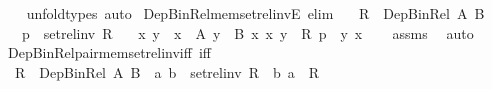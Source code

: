 \begin{isabellebody}
%
\isadelimproof
\ \ %
\endisadelimproof
%
\isatagproof
{}\isamarkupfalse%
\ unfold{\isacharunderscore}{\kern0pt}types\ auto%
\endisatagproof
{\isafoldproof}%
%
\isadelimproof
\isanewline
%
\endisadelimproof
\isanewline
{}\isamarkupfalse%
\ Dep{\isacharunderscore}{\kern0pt}Bin{\isacharunderscore}{\kern0pt}Rel{\isacharunderscore}{\kern0pt}mem{\isacharunderscore}{\kern0pt}set{\isacharunderscore}{\kern0pt}rel{\isacharunderscore}{\kern0pt}invE\ {\isacharbrackleft}{\kern0pt}elim{\isacharbrackright}{\kern0pt}{\isacharcolon}{\kern0pt}\isanewline
\ \ \ {\isachardoublequoteopen}R\ {\isacharcolon}{\kern0pt}\ Dep{\isacharunderscore}{\kern0pt}Bin{\isacharunderscore}{\kern0pt}Rel\ A\ B{\isachardoublequoteclose}\isanewline
\ \ \ {\isachardoublequoteopen}p\ {\isasymin}\ set{\isacharunderscore}{\kern0pt}rel{\isacharunderscore}{\kern0pt}inv\ R{\isachardoublequoteclose}\isanewline
\ \ \ x\ y\ \ {\isachardoublequoteopen}x\ {\isacharcolon}{\kern0pt}\ A{\isachardoublequoteclose}\ {\isachardoublequoteopen}y\ {\isacharcolon}{\kern0pt}\ B\ x{\isachardoublequoteclose}\ {\isachardoublequoteopen}{\isasymlangle}x{\isacharcomma}{\kern0pt}\ y{\isasymrangle}\ {\isasymin}\ R{\isachardoublequoteclose}\ {\isachardoublequoteopen}p\ {\isacharequal}{\kern0pt}\ {\isasymlangle}y{\isacharcomma}{\kern0pt}\ x{\isasymrangle}{\isachardoublequoteclose}\isanewline
%
\isadelimproof
\ \ %
\endisadelimproof
%
\isatagproof
{}\isamarkupfalse%
\ assms\ \isamarkupfalse%
\ auto%
\endisatagproof
{\isafoldproof}%
%
\isadelimproof
\isanewline
%
\endisadelimproof
\isanewline
{}\isamarkupfalse%
\ Dep{\isacharunderscore}{\kern0pt}Bin{\isacharunderscore}{\kern0pt}Rel{\isacharunderscore}{\kern0pt}pair{\isacharunderscore}{\kern0pt}mem{\isacharunderscore}{\kern0pt}set{\isacharunderscore}{\kern0pt}rel{\isacharunderscore}{\kern0pt}inv{\isacharunderscore}{\kern0pt}iff\ {\isacharbrackleft}{\kern0pt}iff{\isacharbrackright}{\kern0pt}{\isacharcolon}{\kern0pt}\isanewline
\ \ {\isachardoublequoteopen}R\ {\isacharcolon}{\kern0pt}\ Dep{\isacharunderscore}{\kern0pt}Bin{\isacharunderscore}{\kern0pt}Rel\ A\ B\ {\isasymLongrightarrow}\ {\isasymlangle}a{\isacharcomma}{\kern0pt}\ b{\isasymrangle}\ {\isasymin}\ set{\isacharunderscore}{\kern0pt}rel{\isacharunderscore}{\kern0pt}inv\ R\ {\isasymlongleftrightarrow}\ {\isasymlangle}b{\isacharcomma}{\kern0pt}\ a{\isasymrangle}\ {\isasymin}\ R{\isachardoublequoteclose}\isanewline
%
\isadelimproof
\ \ %
\endisadelimproof
%
\isatagproof
{}\isamarkupfalse%

\end{isabellebody}
